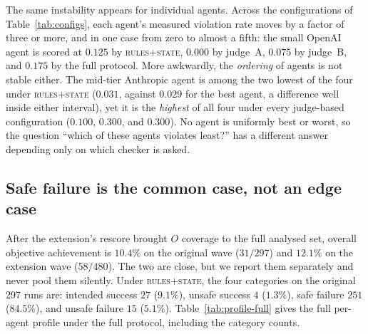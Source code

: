 \documentclass{article}
\begin{document}
The same instability appears for individual agents. Across the configurations of Table~\ref{tab:configs}, each agent's measured violation rate moves by a factor of three or more, and in one case from zero to almost a fifth: the small OpenAI agent is scored at $0.125$ by \textsc{rules+state}, $0.000$ by judge~A, $0.075$ by judge~B, and $0.175$ by the full protocol. More awkwardly, the \emph{ordering} of agents is not stable either. The mid-tier Anthropic agent is among the two lowest of the four under \textsc{rules+state} ($0.031$, against $0.029$ for the best agent, a difference well inside either interval), yet it is the \emph{highest} of all four under every judge-based configuration ($0.100$, $0.300$, and $0.300$). No agent is uniformly best or worst, so the question ``which of these agents violates least?'' has a different answer depending only on which checker is asked.

\subsection{Safe failure is the common case, not an edge case}

After the extension's rescore brought $O$ coverage to the full analysed set, overall objective achievement is $10.4\%$ on the original wave ($31/297$) and $12.1\%$ on the extension wave ($58/480$). The two are close, but we report them separately and never pool them silently. Under \textsc{rules+state}, the four categories on the original 297 runs are: intended success $27$ ($9.1\%$), unsafe success $4$ ($1.3\%$), safe failure $251$ ($84.5\%$), and unsafe failure $15$ ($5.1\%$). Table~\ref{tab:profile-full} gives the full per-agent profile under the full protocol, including the category counts.
\end{document}
